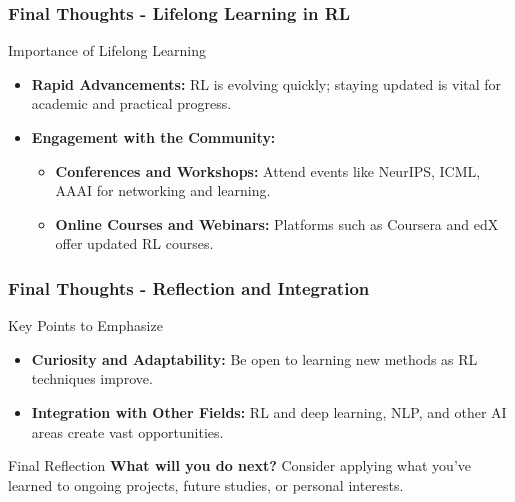 \documentclass[aspectratio=169]{beamer}
\begin{document}
\begin{frame}[fragile]
    \frametitle{Final Thoughts - Lifelong Learning in RL}
    
    \begin{block}{Importance of Lifelong Learning}
        \begin{itemize}
            \item \textbf{Rapid Advancements:} RL is evolving quickly; staying updated is vital for academic and practical progress.
            \item \textbf{Engagement with the Community:}
            \begin{itemize}
                \item \textbf{Conferences and Workshops:} Attend events like NeurIPS, ICML, AAAI for networking and learning.
                \item \textbf{Online Courses and Webinars:} Platforms such as Coursera and edX offer updated RL courses.
            \end{itemize}
        \end{itemize}
    \end{block}
\end{frame}

\begin{frame}[fragile]
    \frametitle{Final Thoughts - Reflection and Integration}
    
    \begin{block}{Key Points to Emphasize}
        \begin{itemize}
            \item \textbf{Curiosity and Adaptability:} Be open to learning new methods as RL techniques improve.
            \item \textbf{Integration with Other Fields:} RL and deep learning, NLP, and other AI areas create vast opportunities.
        \end{itemize}
    \end{block}

    \begin{block}{Final Reflection}
        \textbf{What will you do next?} Consider applying what you've learned to ongoing projects, future studies, or personal interests.
    \end{block}
\end{frame}
\end{document}
